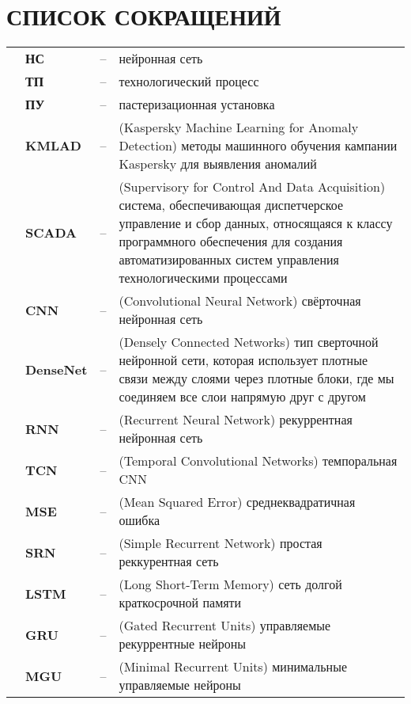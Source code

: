 \sectionbreak \section*{ 
    \gostTitleFont
    \redline
    СПИСОК СОКРАЩЕНИЙ
}
\titlespace

{\gostFont

\begin{tabular}{p{0.85cm} p{1.6cm} p{0.3cm} p{132.5mm}}
    & {\bfseries НС} & {--} & нейронная сеть \\
    & {\bfseries ТП} & {--} & технологический процесс \\
    & {\bfseries ПУ} & {--} & пастеризационная установка \\
    & {\bfseries KMLAD} & {--} & (Kaspersky Machine Learning for Anomaly Detection) методы машинного обучения кампании Kaspersky для выявления аномалий \\
    & {\bfseries SCADA} & {--} & (Supervisory for Control And Data Acquisition) система, обеспечивающая диспетчерское управление и сбор данных, относящаяся к классу программного обеспечения для создания автоматизированных систем управления технологическими процессами \\
    & {\bfseries CNN} & {--} & (Convolutional Neural Network) свёрточная нейронная сеть \\
    & {\bfseries DenseNet} & {--} & (Densely Connected Networks) тип сверточной нейронной сети, которая использует плотные связи между слоями через плотные блоки, где мы соединяем все слои напрямую друг с другом \\
    & {\bfseries RNN} & {--} & (Recurrent Neural Network) рекуррентная нейронная сеть \\
    & {\bfseries TCN} & {--} & (Temporal Convolutional Networks) темпоральная CNN \\
    & {\bfseries MSE} & {--} & (Mean Squared Error) среднеквадратичная ошибка \\
    & {\bfseries SRN} & {--} & (Simple Recurrent Network) простая реккурентная сеть \\
    & {\bfseries LSTM} & {--} & (Long Short-Term Memory) сеть долгой краткосрочной памяти \\
    & {\bfseries GRU} & {--} & (Gated Recurrent Units) управляемые рекуррентные нейроны \\
    & {\bfseries MGU} & {--} & (Minimal Recurrent Units) минимальные управляемые нейроны \\
\end{tabular}

}
